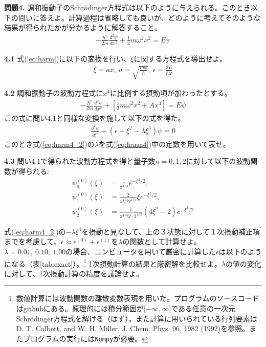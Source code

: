 \documentclass[11pt,pra,aps]{revtex4}
\begin{document}
\noindent
{\bf 問題4.} 調和振動子のSchr\"odinger方程式は以下のように与えられる。このとき以下の問いに答えよ。計算過程は省略しても良いが、どのように考えてそのような結果が得られたかが分かるように解答すること。
\begin{align}
  -\frac{\hbar^2}{2m}\frac{d^2\psi}{dx^2}+\frac{1}{2}m\omega^2x^2=E\psi \label{eq:harm}
\end{align}

\noindent
{\bf 4.1} 式(\ref{eq:harm})に以下の変換を行い、$\xi$に関する方程式を導出せよ。
\begin{align}
  \xi=ax,\ a=\sqrt{\frac{m\omega}{\hbar}},\ \epsilon=\frac{2E}{\hbar\omega}
\end{align}

\noindent
{\bf 4.2} 調和振動子の波動方程式に$x^4$に比例する摂動項が加わったとする。
\begin{align}
  -\frac{\hbar^2}{2m}\frac{d^2\psi}{dx^2}+\left[\frac{1}{2}m\omega^2x^2+Ax^4\right]=E\psi \label{eq:harm4}
\end{align}
この式に問い4.1と同様な変換を施して以下の式を得た。
\begin{align}
  \frac{\partial^2\psi}{\partial \xi^2}+(\epsilon-\xi^2-\lambda\xi^4)\psi=0 \label{eq:harm4_2}
\end{align}
このとき式(\ref{eq:harm4_2})の$\lambda$を式(\ref{eq:harm4})中の定数を用いて表せ。

\noindent
{\bf 4.3} 問い4.1で得られた波動方程式を得と量子数$n=0,1,2$に対して以下の波動関数が得られる:
\begin{align}
  \psi_0^{(0)}(\xi)&=\frac{1}{\pi^{1/4}} e^{-\xi^2/2}, \\
  \psi_1^{(0)}(\xi)&=\frac{2}{\pi^{1/4}2^{1/2}} \xi e^{-\xi^2/2}, \\
  \psi_2^{(0)}(\xi)&=\frac{1}{\pi^{1/4}2\cdot 2^{1/2}} (4\xi^2-2)e^{-\xi^2/2}
\end{align}

式(\ref{eq:harm4_2})の$-\lambda\xi^4$を摂動と見なして、上の３状態に対して１次摂動補正項までを考慮して、$\epsilon\approx\epsilon^{(0)}+\epsilon^{(1)}$を$\lambda$の関数として計算せよ。$\lambda=0.01,\ 0.10,\ 1.00$の場合、コンピュータを用いて厳密に計算した$\epsilon$は以下のようになる（表\ref{tab:exact}）。\footnote{数値計算には波動関数の離散変数表現を用いた。プログラムのソースコードは\href{https://github.com/msaitow/okiba/blob/main/dvr-anharmonic.py}
 {github}にある。原理的には積分範囲が[$-\infty,\infty$]である任意の一次元Schr\"odinger方程式を解ける（はず）。また計算に用いられている行列要素はD. T. Colbert, and W. H. Miller, J. Chem. Phys. 96, 1982 (1992)を参照。またプログラムの実行には{\tt Numpy}が必要。} 1次摂動計算の結果と厳密解を比較せよ。$\lambda$の値の変化に対して、1次摂動計算の精度を議論せよ。
\end{document}
